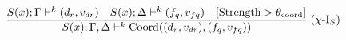 \documentclass[preview]{standalone}
\begin{document}
\begin{align*}
\special{dvisvgm:raw <g id='unique000'>}\frac{S(x);\Gamma \vdash^k (d_r, v_{dr}) \quad S(x);\Delta \vdash^k (f_q, v_{fq}) \quad [\operatorname{Strength}>\theta_{\text{coord}}]}{S(x);\Gamma,\Delta \vdash^k \operatorname{Coord}((d_r, v_{dr}), (f_q, v_{fq}))}\; (\chi\text{-I}_S)\special{dvisvgm:raw </g>}
\end{align*}
\end{document}
